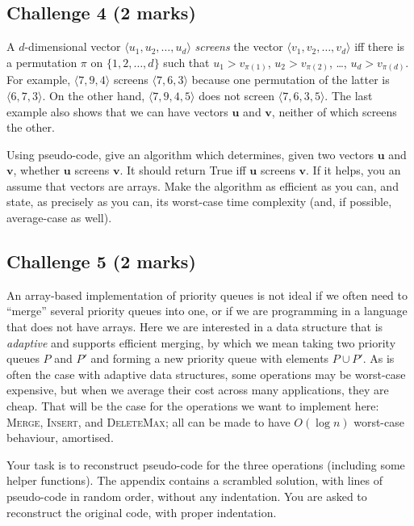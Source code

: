 \documentclass[11pt]{article}
\newcommand{\tuple}[1]{\langle #1 \rangle}
\begin{document}
\subsection*{Challenge 4 \hfill {\small (2 marks)}}

A $d$-dimensional vector $\tuple{u_1,u_2,\ldots,u_d}$ \emph{screens}
the vector $\tuple{v_1,v_2,\ldots,v_d}$ iff there is a permutation
$\pi$ on $\{1,2,\ldots,d\}$ such that
$u_1 > v_{\pi(1)}$,
$u_2 > v_{\pi(2)}$,
\ldots,
$u_d > v_{\pi(d)}$.
For example, $\tuple{7,9,4}$ screens $\tuple{7,6,3}$ 
because one permutation of the latter is $\tuple{6,7,3}$.
On the other hand, $\tuple{7,9,4,5}$ does not screen $\tuple{7,6,3,5}$.
The last example also shows that we can have vectors 
$\mathbf{u}$ and $\mathbf{v}$, neither of which screens the other.

Using pseudo-code, 
give an algorithm which determines, given two vectors $\mathbf{u}$
and $\mathbf{v}$, whether $\mathbf{u}$ screens $\mathbf{v}$.
It should return True iff $\mathbf{u}$ screens $\mathbf{v}$.
If it helps, you an assume that vectors are arrays.
Make the algorithm as efficient as you can, and state,
as precisely as you can, its worst-case time complexity
(and, if possible, average-case as well).

\subsection*{Challenge 5 \hfill {\small (2 marks)}}

An array-based implementation of priority queues is not ideal if we
often need to ``merge'' several priority queues into one, or if we
are programming in a language that does not have arrays.
Here we are interested in a data structure that is \emph{adaptive}
and supports efficient merging, by which we mean taking two
priority queues $P$ and $P'$ and forming a new priority queue with 
elements $P \cup P'$.
As is often the case with adaptive data structures, some operations
may be worst-case expensive, but when we average their cost across many
applications, they are cheap.
That will be the case for the operations we want to implement here:
\textsc{Merge}, \textsc{Insert}, and \textsc{DeleteMax};
all can be made to have $O(\log n)$ worst-case behaviour, amortised.

Your task is to reconstruct pseudo-code for the three operations
(including some helper functions).
The appendix contains a scrambled solution,
with lines of pseudo-code in random order, without any indentation.
You are asked to reconstruct the original code, with proper indentation.
\end{document}
